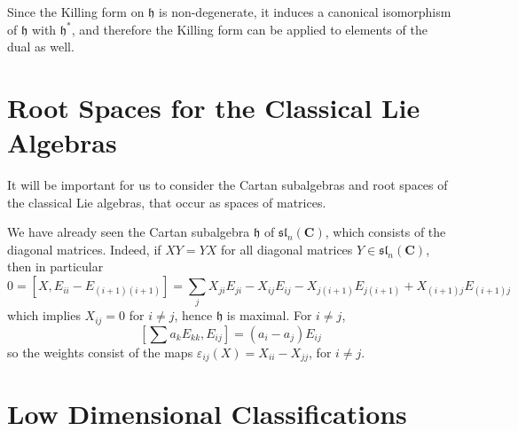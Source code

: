 Since the Killing form on $\mathfrak{h}$ is non-degenerate, it induces a canonical isomorphism of $\mathfrak{h}$ with $\mathfrak{h}^*$, and therefore the Killing form can be applied to elements of the dual as well.





\section{Root Spaces for the Classical Lie Algebras}

It will be important for us to consider the Cartan subalgebras and root spaces of the classical Lie algebras, that occur as spaces of matrices.

We have already seen the Cartan subalgebra $\mathfrak{h}$ of $\mathfrak{sl}_n(\mathbf{C})$, which consists of the diagonal matrices. Indeed, if $XY = YX$ for all diagonal matrices $Y \in \mathfrak{sl}_n(\mathbf{C})$, then in particular
%
\[ 0 = [X,E_{ii} - E_{(i+1)(i+1)}] = \sum_j X_{ji} E_{ji} - X_{ij} E_{ij} - X_{j(i+1)} E_{j(i+1)} + X_{(i+1)j} E_{(i+1)j} \]
%
which implies $X_{ij} = 0$ for $i \neq j$, hence $\mathfrak{h}$ is maximal. For $i \neq j$,
%
\[ \left[\sum a_k E_{kk} ,E_{ij} \right] = (a_i - a_j) E_{ij} \]
%
so the weights consist of the maps $\varepsilon_{ij}(X) = X_{ii} - X_{jj}$, for $i \ne j$.















\section{Low Dimensional Classifications}

